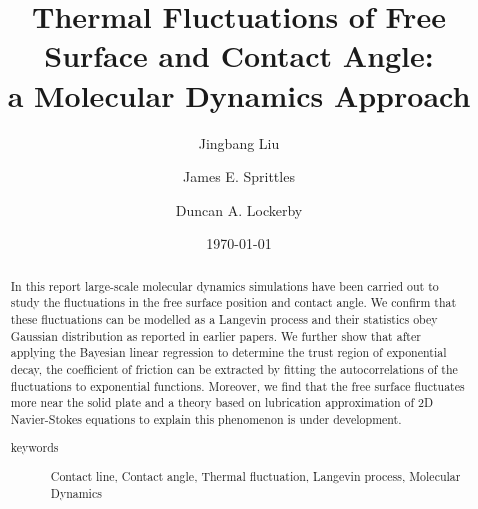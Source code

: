 \documentclass[
reprint,
 amsmath,amssymb,
 aps,
url
]{revtex4-1}
\begin{document}

\title{Thermal Fluctuations of Free Surface and Contact Angle: \\a Molecular Dynamics Approach}%


\author{Jingbang Liu}
%


\author{James E. Sprittles}
%

\author{Duncan A. Lockerby}
%


\date{\today}%

\begin{abstract}
In this report large-scale molecular dynamics simulations have been carried out to study the fluctuations in the free surface position and contact angle. We confirm that these fluctuations can be modelled as a Langevin process and their statistics obey Gaussian distribution as reported in earlier papers. We further show that after applying the Bayesian linear regression to determine the trust region of exponential decay, the coefficient of friction can be extracted by fitting the autocorrelations of the fluctuations to exponential functions. Moreover, we find that the free surface fluctuates more near the solid plate and a theory based on lubrication approximation of 2D Navier-Stokes equations to explain this phenomenon is under development. 

\begin{description}
\item[keywords]
Contact line, Contact angle, Thermal fluctuation, Langevin process, Molecular Dynamics
\end{description}
\end{abstract}

\maketitle

\end{document}
